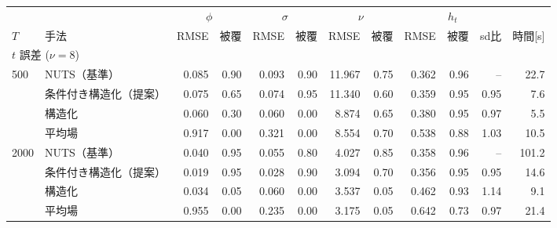 \begin{tabular}{llrrrrrrrrrr}
\toprule
 & & \multicolumn{2}{c}{$\phi$} & \multicolumn{2}{c}{$\sigma$} & \multicolumn{2}{c}{$\nu$} & \multicolumn{3}{c}{$h_t$} & \\
$T$ & 手法 & RMSE & 被覆 & RMSE & 被覆 & RMSE & 被覆 & RMSE & 被覆 & sd比 & 時間[s] \\
\midrule
\multicolumn{12}{l}{$t$ 誤差 ($\nu=8$)} \\
500 & NUTS（基準） & 0.085 & 0.90 & 0.093 & 0.90 & 11.967 & 0.75 & 0.362 & 0.96 & -- & 22.7 \\
 & 条件付き構造化（提案） & 0.075 & 0.65 & 0.074 & 0.95 & 11.340 & 0.60 & 0.359 & 0.95 & 0.95 & 7.6 \\
 & 構造化 & 0.060 & 0.30 & 0.060 & 0.00 & 8.874 & 0.65 & 0.380 & 0.95 & 0.97 & 5.5 \\
 & 平均場 & 0.917 & 0.00 & 0.321 & 0.00 & 8.554 & 0.70 & 0.538 & 0.88 & 1.03 & 10.5 \\
2000 & NUTS（基準） & 0.040 & 0.95 & 0.055 & 0.80 & 4.027 & 0.85 & 0.358 & 0.96 & -- & 101.2 \\
 & 条件付き構造化（提案） & 0.019 & 0.95 & 0.028 & 0.90 & 3.094 & 0.70 & 0.356 & 0.95 & 0.95 & 14.6 \\
 & 構造化 & 0.034 & 0.05 & 0.060 & 0.00 & 3.537 & 0.05 & 0.462 & 0.93 & 1.14 & 9.1 \\
 & 平均場 & 0.955 & 0.00 & 0.235 & 0.00 & 3.175 & 0.05 & 0.642 & 0.73 & 0.97 & 21.4 \\
\bottomrule
\end{tabular}
